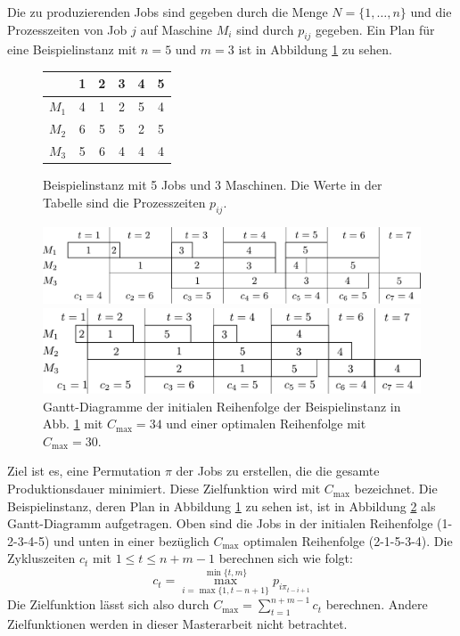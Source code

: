 \documentclass{scrreprt}
\begin{document}
Die zu produzierenden Jobs sind gegeben durch die Menge $N=\{1,\ldots,n\}$ 
und die Prozesszeiten von Job $j$ auf Maschine $M_i$ sind durch $p_{ij}$ gegeben.
Ein Plan für eine Beispielinstanz mit $n=5$ und $m=3$ ist in Abbildung \ref{abb:Bsp} zu sehen.
\begin{figure}[h]
    \begin{center}
        \begin{tabular}{c|ccccc}
                  & 1 & 2 & 3 & 4 & 5 \\ \hline
            $M_1$ & 4 & 1 & 2 & 5 & 4 \\ 
            $M_2$ & 6 & 5 & 5 & 2 & 5 \\
            $M_3$ & 5 & 6 & 4 & 4 & 4 
        \end{tabular}
    \end{center}
    \caption{
        \label{abb:Bsp}
        Beispielinstanz mit 5 Jobs und 3 Maschinen. Die Werte in der Tabelle sind die Prozesszeiten $p_{ij}$.
    }
\end{figure}
\begin{figure}
    \begin{center}
        \includegraphics[width=.8\textwidth]{graphics/bspinit.pdf}
    \end{center}
    \begin{center}
        \includegraphics[width=.8\textwidth]{graphics/bspopt.pdf}
    \end{center}
    \caption{
        \label{abb:gantt}
        Gantt-Diagramme der initialen Reihenfolge der Beispielinstanz in Abb. \ref{abb:Bsp} mit $C_{\max}=34$
        und einer optimalen Reihenfolge mit $C_{\max}=30$.
    }
\end{figure}
Ziel ist es, eine Permutation $\pi$ der Jobs zu erstellen, die die gesamte Produktionsdauer minimiert.
Diese Zielfunktion wird mit $C_{\max}$ bezeichnet.
Die Beispielinstanz, deren Plan in Abbildung \ref{abb:Bsp} zu sehen ist, ist in Abbildung \ref{abb:gantt} als Gantt-Diagramm aufgetragen.
Oben sind die Jobs in der initialen Reihenfolge (1-2-3-4-5) und unten in einer bezüglich $C_{\max}$ optimalen Reihenfolge (2-1-5-3-4).
Die Zykluszeiten $c_t$ mit $1\leq t\leq n+m-1$ berechnen sich wie folgt:
\[ c_t = \max_{i=\max\{1,t-n+1\}}^{\min\{t,m\}} p_{i\pi_{t-i+1}} \]
Die Zielfunktion lässt sich also durch $C_{\max} = \sum_{t=1}^{n+m-1} c_t$ berechnen.
Andere Zielfunktionen werden in dieser Masterarbeit nicht betrachtet.
\end{document}
